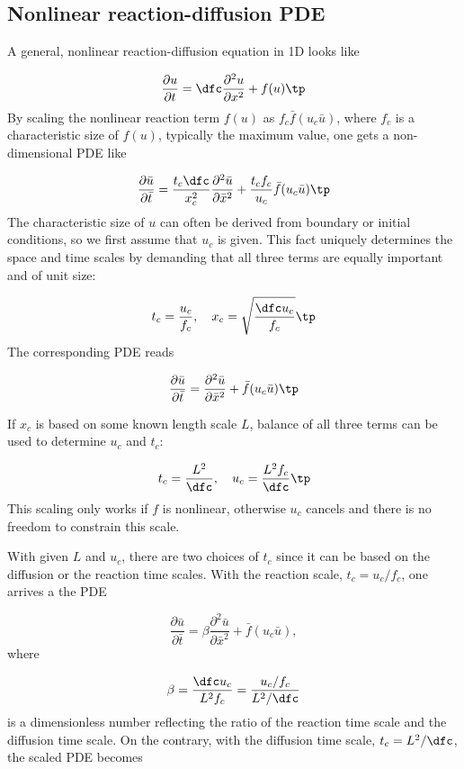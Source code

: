 \documentclass[graybox,envcountchap,sectrefs,final]{svmonodo}
\begin{document}
\subsection{Nonlinear reaction-diffusion PDE}

A general, nonlinear reaction-diffusion equation in 1D looks like

\begin{equation}
\frac{\partial u}{\partial t} = \dfc\frac{\partial^2 u}{\partial x^2} + f(u)
\tp
\end{equation}
By scaling the nonlinear reaction term $f(u)$ as $f_c\bar f(u_c\bar u)$,
where $f_c$ is a characteristic size of $f(u)$, typically the maximum
value, one gets a non-dimensional PDE like

\[
\frac{\partial\bar u}{\partial\bar t} = \frac{t_c\dfc}{x_c^2}
\frac{\partial^2\bar u}{\partial\bar x^2} +
\frac{t_cf_c}{u_c}\bar f(u_c\bar u)\tp
\]
The characteristic size of $u$ can often be derived from boundary or
initial conditions, so we first assume
that $u_c$ is given. This fact uniquely determines the space and time
scales by demanding that all three terms are equally important and
of unit size:

\[ t_c = \frac{u_c}{f_c},\quad x_c = \sqrt{\frac{\dfc u_c}{f_c}}\tp\]
The corresponding PDE reads

\begin{equation}
\frac{\partial\bar u}{\partial\bar t} =
\frac{\partial^2\bar u}{\partial\bar x^2} + \bar f(u_c\bar u)\tp
\end{equation}

If $x_c$ is based on some known length scale $L$, balance of all three
terms can be used to determine $u_c$ and $t_c$:

\[ t_c = \frac{L^2}{\dfc},\quad u_c = \frac{L^2 f_c}{\dfc}\tp\]
This scaling only works if $f$ is nonlinear, otherwise $u_c$ cancels
and there is no freedom to constrain this scale.

With given $L$ and $u_c$, there are two choices of $t_c$ since it can
be based on the diffusion or the reaction time scales. With
the reaction scale, $t_c = u_c/f_c$, one arrives a the PDE

\begin{equation}
\frac{\partial\bar u}{\partial\bar t} =
\beta\frac{\partial^2\bar u}{\partial\bar x^2} + \bar f(u_c\bar u),
\end{equation}
where

\[ \beta = \frac{\dfc u_c}{L^2 f_c} = \frac{u_c/f_c}{L^2/\dfc}\]
is a dimensionless number reflecting the ratio of the reaction time
scale and the diffusion time scale. On the contrary,
with the
diffusion time scale, $t_c=L^2/\dfc$, the scaled PDE becomes
\end{document}
